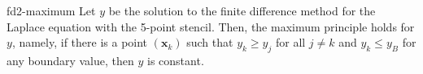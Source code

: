 \begin{Theorem}{fd2-maximum}
  Let $y$ be the solution to the finite difference method for the
  Laplace equation with the 5-point stencil. Then, the maximum
  principle holds for $y$, namely, if there is a point $(\mathbf x_k)$
  such that $y_k\ge y_j$ for all $j\neq k$ and $y_k\le y_B$ for any
  boundary value, then $y$ is constant.
  
\end{Theorem}
